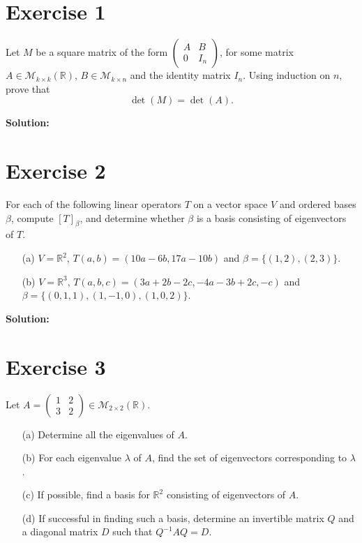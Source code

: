 \documentclass{article}
\begin{document}
\section*{Exercise 1}
Let $M$ be a square matrix of the form $\begin{pmatrix} A & B \\ 0 & I_n \end{pmatrix}$, for some matrix $A \in \mathcal{M}_{k\times k}(\mathbb{R})$, $B \in \mathcal{M}_{k\times n}$ and the identity matrix $I_n$. Using induction on $n$, prove that
\[\det(M) = \det(A).\]

\textbf{Solution:} \\



\newpage

\section*{Exercise 2}
For each of the following linear operators $T$ on a vector space $V$ and ordered bases $\beta$, compute $[T]_\beta$, and determine whether $\beta$ is a basis consisting of eigenvectors of $T$.

\begin{enumerate}
    \item[(a)] $V = \mathbb{R}^2$, $T(a,b) = (10a - 6b, 17a - 10b)$ and $\beta = \{(1,2),(2,3)\}$.

    \item[(b)] $V = \mathbb{R}^3$, $T(a,b,c) = (3a + 2b - 2c, -4a - 3b + 2c, -c)$ and $\beta = \{(0,1,1),(1,-1,0),(1,0,2)\}$.
\end{enumerate}

\textbf{Solution:} \\



\newpage

\section*{Exercise 3}
Let $A = \begin{pmatrix} 1 & 2 \\ 3 & 2 \end{pmatrix} \in \mathcal{M}_{2\times 2}(\mathbb{R})$.

\begin{enumerate}
    \item[(a)] Determine all the eigenvalues of $A$.

    \item[(b)] For each eigenvalue $\lambda$ of $A$, find the set of eigenvectors corresponding to $\lambda$.

    \item[(c)] If possible, find a basis for $\mathbb{R}^2$ consisting of eigenvectors of $A$.

    \item[(d)] If successful in finding such a basis, determine an invertible matrix $Q$ and a diagonal matrix $D$ such that $Q^{-1}AQ = D$.
\end{enumerate}
\end{document}
